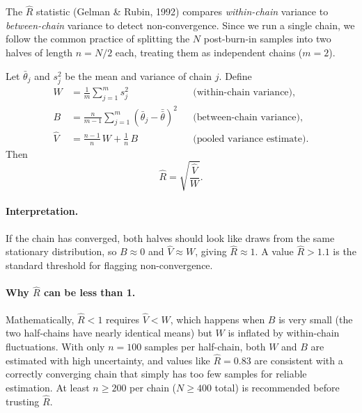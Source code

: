 \documentclass{article}
\begin{document}
The $\hat{R}$ statistic (Gelman \& Rubin, 1992) compares \emph{within-chain} variance to
\emph{between-chain} variance to detect non-convergence.  Since we run a single chain, we follow
the common practice of splitting the $N$ post-burn-in samples into two halves of length
$n = N/2$ each, treating them as independent chains ($m = 2$).

Let $\bar\theta_j$ and $s_j^2$ be the mean and variance of chain $j$.  Define
\begin{align}
  W &= \frac{1}{m}\sum_{j=1}^{m} s_j^2
  && \text{(within-chain variance)}, \\[4pt]
  B &= \frac{n}{m-1}\sum_{j=1}^{m}(\bar\theta_j - \bar{\bar\theta})^2
  && \text{(between-chain variance)}, \\[4pt]
  \hat{V} &= \frac{n-1}{n}\,W + \frac{1}{n}\,B
  && \text{(pooled variance estimate)}.
\end{align}
Then
\begin{equation}
  \hat{R} = \sqrt{\frac{\hat{V}}{W}}.
\end{equation}

\paragraph{Interpretation.}
If the chain has converged, both halves should look like draws from the same stationary
distribution, so $B \approx 0$ and $\hat{V} \approx W$, giving $\hat{R} \approx 1$.
A value $\hat{R} > 1.1$ is the standard threshold for flagging non-convergence.

\paragraph{Why $\hat{R}$ can be less than 1.}
Mathematically, $\hat{R} < 1$ requires $\hat{V} < W$, which happens when $B$ is very small
(the two half-chains have nearly identical means) but $W$ is inflated by within-chain
fluctuations.  With only $n = 100$ samples per half-chain, both $W$ and $B$ are estimated
with high uncertainty, and values like $\hat{R} = 0.83$ are consistent with a correctly
converging chain that simply has too few samples for reliable estimation.  At least
$n \geq 200$ per chain ($N \geq 400$ total) is recommended before trusting $\hat{R}$.



\end{document}
